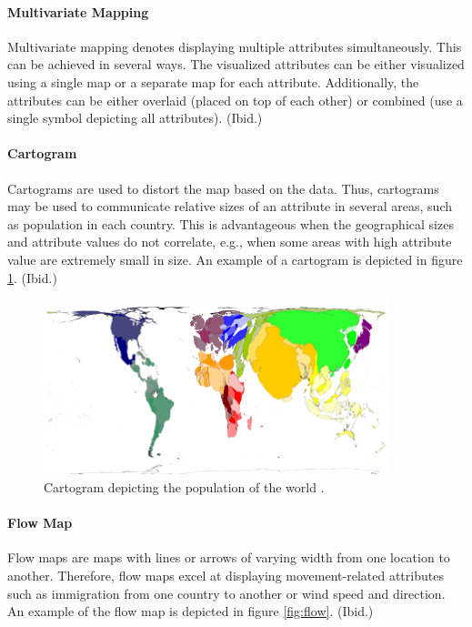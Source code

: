 \paragraph{Multivariate Mapping}

Multivariate mapping denotes displaying multiple attributes simultaneously. This can be achieved in several ways. The visualized attributes can be either visualized using a single map or a separate map for each attribute. Additionally, the attributes can be either overlaid (placed on top of each other) or combined (use a single symbol depicting all attributes). (Ibid.) 

\paragraph{Cartogram}

Cartograms are used to distort the map based on the data. Thus, cartograms may be used to communicate relative sizes of an attribute in several areas, such as population in each country. This is advantageous when the geographical sizes and attribute values do not correlate, e.g., when some areas with high attribute value are extremely small in size. An example of a cartogram is depicted in figure \ref{fig:cartogram}. (Ibid.)

\begin{figure}[htbp]
  \begin{center}
    \includegraphics[width=10cm]{images/cartogram-example.png}
    \caption{Cartogram depicting the population of the world \citep{hennig_population_2014}.}
    \label{fig:cartogram}
  \end{center}
\end{figure}

\paragraph{Flow Map}

Flow maps are maps with lines or arrows of varying width from one location to another. Therefore, flow maps excel at displaying movement-related attributes such as immigration from one country to another or wind speed and direction. An example of the flow map is depicted in figure \ref{fig:flow}. (Ibid.)

